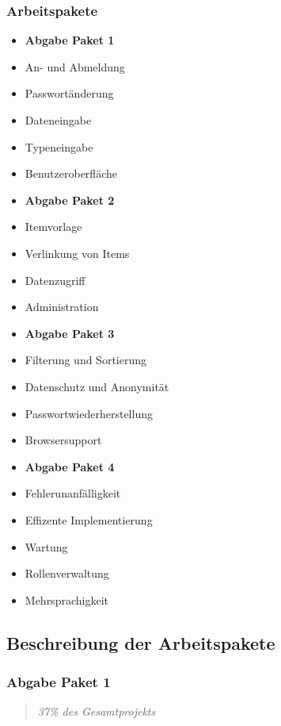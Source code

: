 \subsubsection{Arbeitspakete}\label{arbeitspakete}

\begin{itemize}
\item
  \textbf{Abgabe Paket 1}
\item
  An- und Abmeldung
\item
  Passwortänderung
\item
  Dateneingabe
\item
  Typeneingabe
\item
  Benutzeroberfläche
\item
  \textbf{Abgabe Paket 2}
\item
  Itemvorlage
\item
  Verlinkung von Items
\item
  Datenzugriff
\item
  Administration
\item
  \textbf{Abgabe Paket 3}
\item
  Filterung und Sortierung
\item
  Datenschutz und Anonymität
\item
  Passwortwiederherstellung
\item
  Browsersupport
\item
  \textbf{Abgabe Paket 4}
\item
  Fehlerunanfälligkeit
\item
  Effizente Implementierung
\item
  Wartung
\item
  Rollenverwaltung
\item
  Mehrsprachigkeit
\end{itemize}

\subsection{Beschreibung der
Arbeitspakete}\label{beschreibung-der-arbeitspakete}

\subsubsection{Abgabe Paket 1}\label{abgabe-paket-1}

\begin{quote}
\emph{37\% des Gesamtprojekts}
\end{quote}

